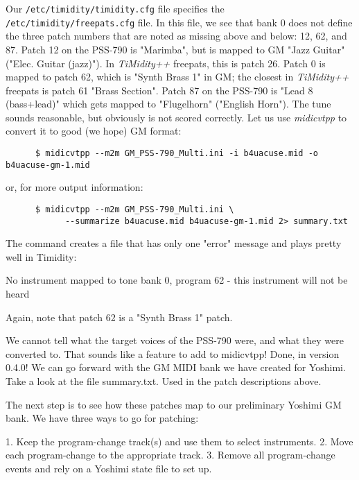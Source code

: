    Our \texttt{/etc/timidity/timidity.cfg}
   file specifies the \texttt{/etc/timidity/freepats.cfg} file.
   In this file, we see that bank 0 does not define the three patch numbers
   that are noted as missing above and below:  12, 62, and 87.  Patch 12 on the
   PSS-790 is "Marimba", but is mapped to GM "Jazz Guitar" ("Elec. Guitar
   (jazz)").  In \textsl{TiMidity++} freepats, this is patch 26.
   Patch 0 is mapped to
   patch 62, which is "Synth Brass 1" in GM;
   the closest in \textsl{TiMidity++} freepats is
   patch 61 "Brass Section".  Patch 87 on the PSS-790 is "Lead 8 (bass+lead)"
   which gets mapped to "Flugelhorn" ("English Horn").
   The tune sounds reasonable, but obviously is not scored correctly.
   Let us use \textsl{midicvtpp} \cite{midicvt}
   to convert it to good (we hope) GM format:

   \begin{verbatim}
      $ midicvtpp --m2m GM_PSS-790_Multi.ini -i b4uacuse.mid -o b4uacuse-gm-1.mid
   \end{verbatim}

   or, for more output information:

   \begin{verbatim}
      $ midicvtpp --m2m GM_PSS-790_Multi.ini \
            --summarize b4uacuse.mid b4uacuse-gm-1.mid 2> summary.txt
   \end{verbatim}

   The command creates a file that has only one "error" message and
   plays pretty well in Timidity:

      No instrument mapped to tone bank 0, program 62 -
          this instrument will not be heard

   Again, note that patch 62 is a "Synth Brass 1" patch.

   We cannot tell what the target voices of the PSS-790 were, and what they
   were converted to.  That sounds like a feature to add to midicvtpp!  Done,
   in version 0.4.0!  We can go forward with the GM MIDI bank we have created
   for Yoshimi.  Take a look at the file summary.txt.  Used in the patch
   descriptions above.

   The next step is to see how these patches map to our preliminary Yoshimi GM
   bank.  We have three ways to go for patching:

   1. Keep the program-change track(s) and use them to select instruments.
   2. Move each program-change to the appropriate track.
   3. Remove all program-change events and rely on a Yoshimi state file
      to set up.

